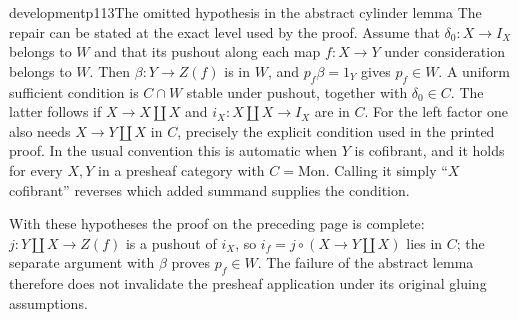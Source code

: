 \begin{dcomment}{development}{p113}{The omitted hypothesis in the abstract cylinder lemma}
The repair can be stated at the exact level used by the proof. Assume that $\delta_0:X\to I_X$ belongs to $W$ and that its pushout along each map $f:X\to Y$ under consideration belongs to $W$. Then $\beta:Y\to Z(f)$ is in $W$, and $p_f\beta=1_Y$ gives $p_f\in W$. A uniform sufficient condition is $C\cap W$ stable under pushout, together with $\delta_0\in C$. The latter follows if $X\to X\amalg X$ and $i_X:X\amalg X\to I_X$ are in $C$. For the left factor one also needs $X\to Y\amalg X$ in $C$, precisely the explicit condition used in the printed proof. In the usual convention this is automatic when $Y$ is cofibrant, and it holds for every $X,Y$ in a presheaf category with $C=\mathrm{Mon}$. Calling it simply ``$X$ cofibrant'' reverses which added summand supplies the condition.

With these hypotheses the proof on the preceding page is complete: $j:Y\amalg X\to Z(f)$ is a pushout of $i_X$, so $i_f=j\circ(X\to Y\amalg X)$ lies in $C$; the separate argument with $\beta$ proves $p_f\in W$. The failure of the abstract lemma therefore does not invalidate the presheaf application under its original gluing assumptions.
\end{dcomment}

